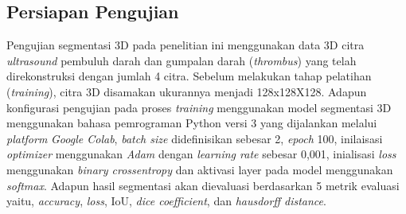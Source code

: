 \subsection{Persiapan Pengujian}
Pengujian segmentasi 3D pada penelitian ini menggunakan data 3D citra \textit{ultrasound} pembuluh darah dan gumpalan darah (\textit{thrombus}) yang telah direkonstruksi dengan jumlah 4 citra. Sebelum melakukan tahap pelatihan (\textit{training}), citra 3D disamakan ukurannya menjadi 128x128X128. Adapun konfigurasi pengujian pada proses \textit{training} menggunakan model segmentasi 3D menggunakan bahasa pemrograman Python versi 3 yang dijalankan melalui \textit{platform} \textit{Google Colab}, \textit{batch size} didefinisikan sebesar 2, \textit{epoch} 100, inilaisasi \textit{optimizer} menggunakan \textit{Adam} dengan \textit{learning rate} sebesar 0,001, inialisasi \textit{loss} menggunakan \textit{binary crossentropy} dan aktivasi layer pada model menggunakan \textit{softmax}. Adapun hasil segmentasi akan dievaluasi berdasarkan 5 metrik evaluasi yaitu, \textit{accuracy}, \textit{loss}, IoU, \textit{dice coefficient}, dan \textit{hausdorff distance}.

%
%
